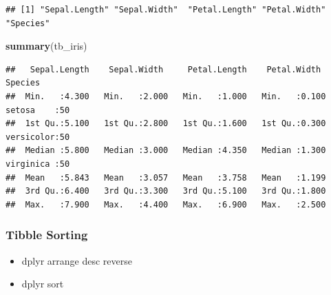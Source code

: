 \documentclass[
]{book}
\newenvironment{Shaded}{\begin{snugshade}}{\end{snugshade}}
\newcommand{\CommentTok}[1]{\textcolor[rgb]{0.56,0.35,0.01}{\textit{#1}}}
\newcommand{\DecValTok}[1]{\textcolor[rgb]{0.00,0.00,0.81}{#1}}
\newcommand{\KeywordTok}[1]{\textcolor[rgb]{0.13,0.29,0.53}{\textbf{#1}}}
\newcommand{\NormalTok}[1]{#1}
\newcommand{\OperatorTok}[1]{\textcolor[rgb]{0.81,0.36,0.00}{\textbf{#1}}}
\newcommand{\StringTok}[1]{\textcolor[rgb]{0.31,0.60,0.02}{#1}}
\providecommand{\tightlist}{%
  \setlength{\itemsep}{0pt}\setlength{\parskip}{0pt}}
\begin{document}
\begin{verbatim}
## [1] "Sepal.Length" "Sepal.Width"  "Petal.Length" "Petal.Width"  "Species"
\end{verbatim}

\begin{Shaded}
\begin{Highlighting}[]
\KeywordTok{summary}\NormalTok{(tb_iris)}
\end{Highlighting}
\end{Shaded}

\begin{verbatim}
##   Sepal.Length    Sepal.Width     Petal.Length    Petal.Width          Species  
##  Min.   :4.300   Min.   :2.000   Min.   :1.000   Min.   :0.100   setosa    :50  
##  1st Qu.:5.100   1st Qu.:2.800   1st Qu.:1.600   1st Qu.:0.300   versicolor:50  
##  Median :5.800   Median :3.000   Median :4.350   Median :1.300   virginica :50  
##  Mean   :5.843   Mean   :3.057   Mean   :3.758   Mean   :1.199                  
##  3rd Qu.:6.400   3rd Qu.:3.300   3rd Qu.:5.100   3rd Qu.:1.800                  
##  Max.   :7.900   Max.   :4.400   Max.   :6.900   Max.   :2.500
\end{verbatim}

\hypertarget{tibble-sorting}{%
\subsubsection{Tibble Sorting}\label{tibble-sorting}}

\begin{itemize}
\tightlist
\item
  dplyr arrange desc reverse
\item
  dplyr sort
\end{itemize}

\begin{Shaded}
\end{Shaded}
\end{document}
